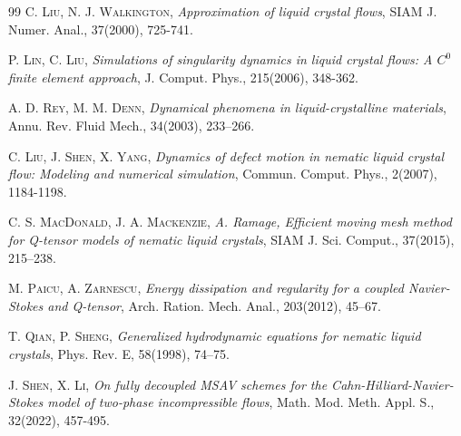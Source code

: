 \documentclass[12pt,reqno]{amsart}
\numberwithin{equation}{section}
\begin{document}
\begin{thebibliography}{99}
 \textsc{C. Liu, N. J. Walkington}, \emph{Approximation of liquid crystal flows}, SIAM J. Numer. Anal., 37(2000), 725-741. 

 \textsc{P. Lin, C. Liu}, \emph{Simulations of singularity dynamics in liquid crystal flows: A $C^0$ finite element approach}, J. Comput. Phys., 215(2006), 348-362.

 \textsc{A. D. Rey, M. M. Denn}, \emph{Dynamical phenomena in liquid-crystalline materials}, Annu. Rev. Fluid Mech., 34(2003), 233–266. 


 \textsc{C. Liu, J. Shen, X. Yang}, \emph{Dynamics of defect motion in nematic liquid crystal flow: Modeling and numerical simulation}, Commun. Comput. Phys., 2(2007), 1184-1198.

%






 \textsc{C. S. MacDonald, J. A. Mackenzie}, \emph{A. Ramage, Efficient moving mesh method for Q-tensor models of nematic liquid crystals}, SIAM J. Sci. Comput., 37(2015), 215–238.

 \textsc{M. Paicu, A. Zarnescu}, \emph{Energy dissipation and regularity for a coupled Navier-Stokes and Q-tensor}, Arch. Ration. Mech. Anal., 203(2012), 45–67.

 \textsc{T. Qian, P. Sheng}, \emph{Generalized hydrodynamic equations for nematic liquid crystals}, Phys. Rev. E, 58(1998), 74–75.

 \textsc{J. Shen, X. Li}, \emph{On fully decoupled MSAV schemes for the Cahn-Hilliard-Navier-Stokes model of two-phase incompressible flows}, Math. Mod. Meth. Appl. S., 32(2022), 457-495.



\end{thebibliography}
\end{document}
